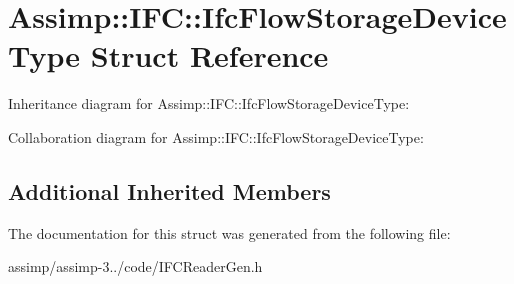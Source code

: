 \hypertarget{struct_assimp_1_1_i_f_c_1_1_ifc_flow_storage_device_type}{\section{Assimp\+:\+:I\+F\+C\+:\+:Ifc\+Flow\+Storage\+Device\+Type Struct Reference}
\label{struct_assimp_1_1_i_f_c_1_1_ifc_flow_storage_device_type}
}


Inheritance diagram for Assimp\+:\+:I\+F\+C\+:\+:Ifc\+Flow\+Storage\+Device\+Type\+:


Collaboration diagram for Assimp\+:\+:I\+F\+C\+:\+:Ifc\+Flow\+Storage\+Device\+Type\+:
\subsection*{Additional Inherited Members}


The documentation for this struct was generated from the following file\+:\begin{DoxyCompactItemize}
\item 
assimp/assimp-\/3../code/I\+F\+C\+Reader\+Gen.\+h\end{DoxyCompactItemize}
